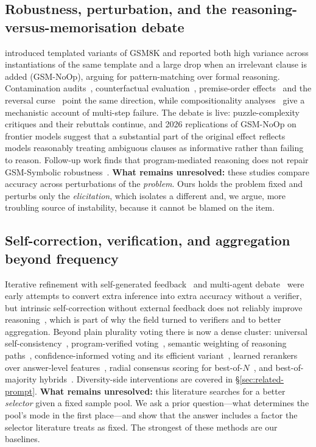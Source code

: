 \subsection{Robustness, perturbation, and the reasoning-versus-memorisation debate}

\citet{mirzadeh2025gsmsymbolic} introduced templated variants of GSM8K and
reported both high variance across instantiations of the same template and a
large drop when an irrelevant clause is added (GSM-NoOp), arguing for
pattern-matching over formal reasoning. Contamination
audits~\citep{zhang2024gsm1k}, counterfactual
evaluation~\citep{wu2024reciting}, premise-order
effects~\citep{chen2024premise} and the reversal
curse~\citep{berglund2024reversal} point the same direction, while
compositionality analyses~\citep{dziri2023faithfate} give a mechanistic account
of multi-step failure. The debate is live: puzzle-complexity critiques and
their rebuttals continue, and 2026 replications of GSM-NoOp on frontier models
suggest that a substantial part of the original effect reflects models
reasonably treating ambiguous clauses as informative rather than failing to
reason. Follow-up
work finds that program-mediated reasoning does not repair GSM-Symbolic
robustness~\citep{reasoningcodeboth2026}. \textbf{What remains unresolved:}
these studies compare accuracy across perturbations of the \emph{problem}. Ours
holds the problem fixed and perturbs only the \emph{elicitation}, which
isolates a different and, we argue, more troubling source of instability,
because it cannot be blamed on the item.

\subsection{Self-correction, verification, and aggregation beyond frequency}

Iterative refinement with self-generated feedback~\citep{madaan2023selfrefine}
and multi-agent debate~\citep{du2024debate} were early attempts to convert extra
inference into extra accuracy without a verifier, but intrinsic self-correction
without external feedback does not reliably improve
reasoning~\citep{huang2024cannotselfcorrect,kamoi2024whencan}, which is part of
why the field turned to verifiers and to better aggregation. Beyond plain
plurality voting there is now a dense cluster: universal
self-consistency~\citep{chen2023universal}, program-verified
voting~\citep{prove2024}, semantic weighting of reasoning
paths~\citep{weightedreasoning2024}, confidence-informed voting and its
efficient variant~\citep{veccisc2026}, learned rerankers over answer-level
features~\citep{risc2026}, radial consensus scoring for
best-of-$N$~\citep{rcs2026}, and best-of-majority
hybrids~\citep{bestofmajority2025}.
Diversity-side interventions are covered in
\S\ref{sec:related-prompt}. \textbf{What remains unresolved:}
this literature searches for a better \emph{selector} given a fixed sample
pool. We ask a prior question---what determines the pool's mode in the first
place---and show that the answer includes a factor the selector literature
treats as fixed. The strongest of these methods are our baselines.

